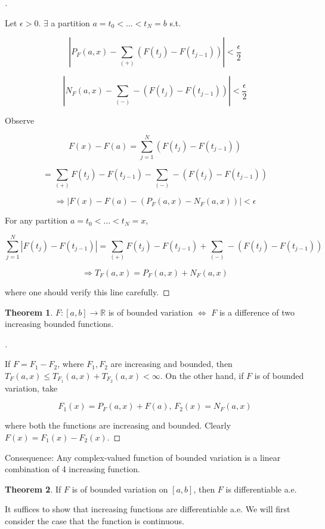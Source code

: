 \documentclass{article}
\theoremstyle{definition}
\newtheorem{thm}{Theorem}
\newenvironment{proofs}[1][\proofname]{%
  \begin{proof}[#1]$ $\par\nobreak\ignorespaces
}{%
  \end{proof}
}
\begin{document}
\begin{proofs}
  Let $\epsilon > 0$. $\exists$ a partition $a = t_0 < \hdots < t_N = b$ s.t. 

  $$|P_F(a, x) - \sum_{(+)} (F(t_j) - F(t_{j - 1}))| < \frac{\epsilon}{2}$$

  
  $$|N_F(a, x) - \sum_{(-)} - (F(t_j) - F(t_{j - 1}))| < \frac{\epsilon}{2}$$

  Observe 

  $$F(x) - F(a) = \sum_{j = 1}^N (F(t_j) - F(t_{j - 1}))$$

  $$ = \sum_{(+)} F(t_j) - F(t_{j - 1}) - \sum_{(-)} -(F(t_j) - F(t_{j - 1}))$$

  $$\Rightarrow  |F(x) - F(a) - (P_F(a, x) - N_F(a, x))| < \epsilon$$

  For any partition $a = t_0 < \hdots < t_N = x$, 

  $$\sum_{j = 1}^N |F(t_j) - F(t_{j - 1})| = \sum_{(+)} F(t_j) - F(t_{j - 1}) + \sum_{(-)} -(F(t_j) - F(t_{j - 1}))$$

  $$\Rightarrow T_F(a, x) = P_F(a, x) + N_F(a, x)$$

  where one should verify this line carefully.
  

\end{proofs}


\begin{thm}
  $F:[a, b] \rightarrow \mathbb{R}$ is of bounded variation $\Leftrightarrow$ $F$ is a difference of two increasing bounded functions. 
\end{thm}

\begin{proofs}
  If $F = F_1 - F_2$, where $F_1, F_2$ are increasing and bounded, then $T_F(a, x) \leq T_{F_1}(a, x) + T_{F_2}(a ,x) < \infty$. On the other hand, if $F$ is of bounded variation, take 

  $$F_1(x) = P_F(a, x) + F(a) \text{, } F_2(x) = N_F(a, x)$$

  where both the functions are increasing and bounded. Clearly $F(x) = F_1(x) - F_2(x)$. 
\end{proofs}

Consequence: Any complex-valued function of bounded variation is a linear combination of 4 increasing function. 

\begin{thm}
  If $F$ is of bounded variation on $[a, b]$, then $F$ is differentiable a.e.
\end{thm}

It suffices to show that increasing functions are differentiable a.e. We will first consider the case that the function is continuous. 
\end{document}
